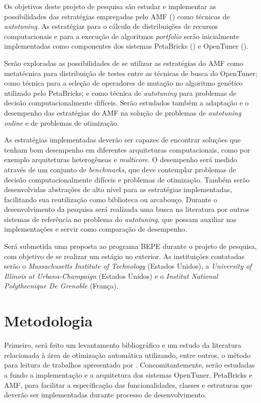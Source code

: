 \documentclass[a4paper, 12pt]{article}
\begin{document}
Os objetivos deste projeto de pesquisa são estudar e implementar as 
possibilidades das estratégias empregadas pelo AMF 
(\citet{goldman2012framework}) como técnicas de \emph{autotuning}. 
As estratégias para o cálculo de distribuições de recursos computacionais 
e para a execução de algoritmos \emph{portfolio} serão inicialmente 
implementadas como componentes dos sistemas PetaBricks (\citet{ansel2014phd}) e
OpenTuner (\citet{ansel2013opentuner}). 

Serão exploradas as possibilidades de se utilizar as estratégias
do AMF como metatécnica para distribuição de testes entre as técnicas de busca
do OpenTuner; como técnica para a seleção de operadores de mutação no algoritmo
genético utilizado pelo PetaBricks; e como técnica de \emph{autotuning} para 
problemas de decisão computacionalmente difíceis. Serão estudados também a 
adaptação e o desempenho das estratégias do AMF na solução de problemas de 
\emph{autotuning online} e de problemas de otimização.

As estratégias implementadas deverão ser capazes de encontrar soluções que 
tenham bom desempenho em diferentes arquiteturas computacionais,
como por exemplo arquiteturas heterogêneas e \emph{multicore}. 
O desempenho será medido através de um conjunto de \emph{benchmarks}, que deve 
contemplar problemas de decisão computacionalmente difíceis e problemas 
de otimização. Também serão desenvolvidas abstrações de alto nível para 
as estratégias implementadas, facilitando sua reutilização como 
biblioteca ou arcabouço. 
Durante o desenvolvimento da pesquisa será realizada uma busca na literatura
por outros sistemas de referência no problema do \emph{autotuning}, que possam
auxiliar nas implementações e servir como comparação de desempenho.

Será submetida uma proposta ao programa BEPE durante o projeto de 
pesquisa, com objetivo de se realizar um estágio no exterior. As
instituições contatadas serão o \emph{Massachusetts Institute of Technology}
(Estados Unidos), a \emph{University of Illinois at Urbana-Champaign} 
(Estados Unidos) e o \emph{Institut National Polythecnique De Grenoble} 
(França).


\section{Metodologia} \label{sec:met}

Primeiro, será feito um levantamento bibliográfico e um estudo da literatura 
relacionada à área de otimização automática utilizando, entre outros, o método 
para leitura de trabalhos apresentado por \citet{keshav2007howtoread}. 
Concomitantemente, serão  estudadas a fundo a implementação e a arquitetura dos
sistemas OpenTuner, PetaBricks e AMF, para facilitar a especificação das 
funcionalidades, classes e estruturas que deverão ser implementadas durante 
processo de desenvolvimento.
\end{document}
